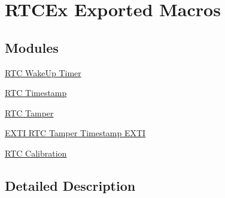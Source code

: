 \hypertarget{group___r_t_c_ex___exported___macros}{}\section{R\+T\+C\+Ex Exported Macros}
\label{group___r_t_c_ex___exported___macros}
\subsection*{Modules}
\begin{DoxyCompactItemize}
\item 
\hyperlink{group___r_t_c_ex___wake_up___timer}{R\+T\+C Wake\+Up Timer}
\item 
\hyperlink{group___r_t_c_ex___timestamp}{R\+T\+C Timestamp}
\item 
\hyperlink{group___r_t_c_ex___tamper}{R\+T\+C Tamper}
\item 
\hyperlink{group___r_t_c_ex___tamper___timestamp}{E\+X\+T\+I R\+T\+C Tamper Timestamp E\+X\+TI}
\item 
\hyperlink{group___r_t_c_ex___calibration}{R\+T\+C Calibration}
\end{DoxyCompactItemize}


\subsection{Detailed Description}
